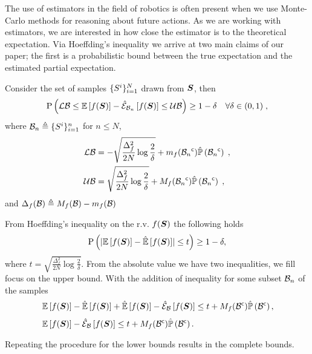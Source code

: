 The use of estimators in the field of robotics is often present when we use Monte-Carlo methods for reasoning about future actions. As we are working with estimators, we are interested in how close the estimator is to the theoretical expectation. Via Hoeffding's inequality we arrive at two main claims of our paper; the first is a probabilistic bound between the true expectation and the estimated partial expectation.

\begin{theoremE}
	\label{thm:partial_hoeffding}
	Consider the set of samples $\{\variable^i\}_{i=1}^N$ drawn from $\RV$, then
	\begin{align*}
		\prob{\lowerbound\leq\expectation{f(\RV)}{}-\partialestimator{f(\RV)}{\subSpace_n}\leq\upperbound}\geq1-\delta&&\forall\delta\in(0,1)\;,
	\end{align*}
	where $\subSpace_n\triangleq\{\variable^i\}_{i=1}^n$ for $n\leq N$,
	\begin{subequations}
		\begin{align}
			\lowerbound & =-\sqrt{\frac{\Delta_f^2}{2N}\log\frac{2}{\delta}}+m_f(\stcomp{\subSpace_n})\estimatedmeasure{\stcomp{\subSpace_n}}\;, \\
			\upperbound & =\sqrt{\frac{\Delta_f^2}{2N}\log\frac{2}{\delta}}+M_f(\stcomp{\subSpace_n})\estimatedmeasure{\stcomp{\subSpace_n}}\;,
		\end{align}
	\end{subequations}
	and $\Delta_f(\subSpace)\triangleq M_f(\subSpace)-m_f(\subSpace)$
\end{theoremE}
\begin{proofE}
	From Hoeffding's inequality on the r.v. $f(\RV)$ the following holds
	\begin{equation*}
		\prob{\abs{\expectation{f(\RV)}{}-\estimator{f(\RV)}{}}\leq t}\geq1-\delta,
	\end{equation*}
	where $t=\sqrt{\frac{\Delta_f^2}{2N}\log\frac{2}{\delta}}$. From the absolute value we have two inequalities, we fill focus on the upper bound.
	With the addition of inequality  for some subset $\subSpace_n$ of the samples
	\begin{align*}
		& \expectation{f(\RV)}{}-\estimator{f(\RV)}{}+\estimator{f(\RV)}{}-\partialestimator{f(\RV)}{\subSpace}\leq t+M_f(\stcomp{\subSpace})\estimatedmeasure{\stcomp{\subSpace}}, \\
		& \expectation{f(\RV)}{}-\partialestimator{f(\RV)}{\subSpace}\leq t+M_f(\stcomp{\subSpace})\estimatedmeasure{\stcomp{\subSpace}}.
	\end{align*}
	Repeating the procedure for the lower bounds results in the complete bounds.
\end{proofE}

